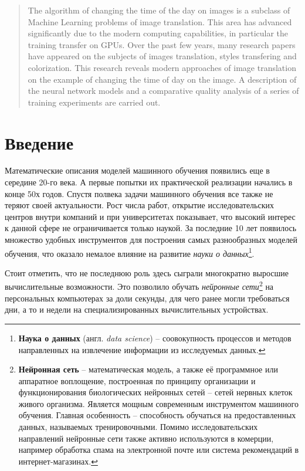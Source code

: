 \documentclass[11pt,a4paper]{extarticle}
\begin{document}
\begin{abstract}
	The algorithm of changing the time of the day on images is a subclass of Machine Learning problems of image translation.
	This area has advanced significantly due to the modern computing capabilities, in particular the training transfer on GPUs.
	Over the past few years, many research papers have appeared on the subjects of images translation, styles transfering and colorization.
	This research reveals modern approaches of image translation on the example of changing the time of day on the image.
	A description of the neural network models and a comparative quality analysis of a series of training experiments are carried out.
\end{abstract}

\newpage
\tableofcontents
\newpage

\section{Введение}
	Математические описания моделей машинного обучения появились еще в середине 20-го века.
	А первые попытки их практической реализации начались в конце 50х годов.
	Спустя полвека задачи машинного обучения все также не теряют своей актуальности.
	Рост числа работ, открытие исследовательских центров внутри компаний и при университетах показывает,
	что высокий интерес к данной сфере не ограничивается только наукой.
	За последние 10 лет появилось множество удобных инструментов для построения самых разнообразных моделей обучения, что оказало немалое влияние на развитие \textit{науки о данных}\footnote{
		\textbf{Наука о данных} (англ. \textit{data science}) -- соовокупность процессов и методов направленных на извлечение информации из исследуемых данных.
	}.  
	
	Стоит отметить, что не последнюю роль здесь сыграли многократно выросшие вычислительные возможности. 
	Это позволило обучать \textit{нейронные сети}\footnote{
		\textbf{Нейронная сеть} --  математическая модель, а также её программное или аппаратное воплощение, 
		построенная по принципу организации и функционирования биологических нейронных сетей -- сетей нервных клеток живого организма.
		Является мощным современным инструментом машинного обучения.
		Главная особенность -- способность обучаться на предоставленных данных, называемых тренировочными.
		Помимо исследовательских направлений нейронные сети также активно используются в комерции, например обработка спама на электронной почте или система рекомендаций в интернет-магазинах.
	} на персональных компьютерах за доли секунды, для чего ранее могли требоваться дни, а то и недели на специализированных вычислительных устройствах.
\end{document}
